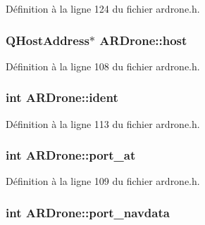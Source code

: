 Définition à la ligne 124 du fichier ardrone.\-h.

\hypertarget{class_a_r_drone_abe1f9338191b05ef8ba8db9340b9c43f}{
\subsubsection[{host}]{\setlength{\rightskip}{0pt plus 5cm}Q\-Host\-Address$\ast$ A\-R\-Drone\-::host\hspace{0.3cm}{\ttfamily [private]}}}\label{class_a_r_drone_abe1f9338191b05ef8ba8db9340b9c43f}


Définition à la ligne 108 du fichier ardrone.\-h.

\hypertarget{class_a_r_drone_a4ad30308ac96408493b6dbe426281c42}{
\subsubsection[{ident}]{\setlength{\rightskip}{0pt plus 5cm}int A\-R\-Drone\-::ident\hspace{0.3cm}{\ttfamily [private]}}}\label{class_a_r_drone_a4ad30308ac96408493b6dbe426281c42}


Définition à la ligne 113 du fichier ardrone.\-h.

\hypertarget{class_a_r_drone_a573c1ae46b8facf60d0abb94ea4cdb64}{
\subsubsection[{port\-\_\-at}]{\setlength{\rightskip}{0pt plus 5cm}int A\-R\-Drone\-::port\-\_\-at\hspace{0.3cm}{\ttfamily [private]}}}\label{class_a_r_drone_a573c1ae46b8facf60d0abb94ea4cdb64}


Définition à la ligne 109 du fichier ardrone.\-h.

\hypertarget{class_a_r_drone_a077d0256466bb8b40a5739a6d556bddf}{
\subsubsection[{port\-\_\-navdata}]{\setlength{\rightskip}{0pt plus 5cm}int A\-R\-Drone\-::port\-\_\-navdata\hspace{0.3cm}{\ttfamily [private]}}}\label{class_a_r_drone_a077d0256466bb8b40a5739a6d556bddf}



